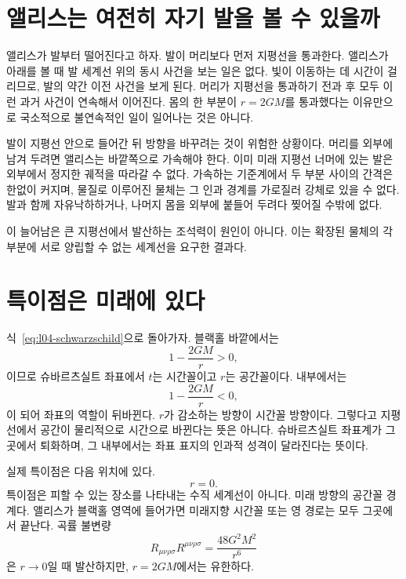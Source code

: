 \section{앨리스는 여전히 자기 발을 볼 수 있을까}

앨리스가 발부터 떨어진다고 하자. 발이 머리보다 먼저 지평선을 통과한다. 앨리스가 아래를 볼 때 발 세계선 위의 동시 사건을 보는 일은 없다. 빛이 이동하는 데 시간이 걸리므로, 발의 약간 이전 사건을 보게 된다. 머리가 지평선을 통과하기 전과 후 모두 이런 과거 사건이 연속해서 이어진다. 몸의 한 부분이 \(r=2GM\)를 통과했다는 이유만으로 국소적으로 불연속적인 일이 일어나는 것은 아니다.

발이 지평선 안으로 들어간 뒤 방향을 바꾸려는 것이 위험한 상황이다. 머리를 외부에 남겨 두려면 앨리스는 바깥쪽으로 가속해야 한다. 이미 미래 지평선 너머에 있는 발은 외부에서 정지한 궤적을 따라갈 수 없다. 가속하는 기준계에서 두 부분 사이의 간격은 한없이 커지며, 물질로 이루어진 물체는 그 인과 경계를 가로질러 강체로 있을 수 없다. 발과 함께 자유낙하하거나, 나머지 몸을 외부에 붙들어 두려다 찢어질 수밖에 없다.

이 늘어남은 큰 지평선에서 발산하는 조석력이 원인이 아니다. 이는 확장된 물체의 각 부분에 서로 양립할 수 없는 세계선을 요구한 결과다.

\section{특이점은 미래에 있다}

식~\eqref{eq:l04-schwarzschild}으로 돌아가자. 블랙홀 바깥에서는
\begin{equation}
1-\frac{2GM}{r}>0,
\end{equation}
이므로 슈바르츠실트 좌표에서 \(t\)는 시간꼴이고 \(r\)는 공간꼴이다. 내부에서는
\begin{equation}
1-\frac{2GM}{r}<0,
\end{equation}
이 되어 좌표의 역할이 뒤바뀐다. \(r\)가 감소하는 방향이 시간꼴 방향이다. 그렇다고 지평선에서 공간이 물리적으로 시간으로 바뀐다는 뜻은 아니다. 슈바르츠실트 좌표계가 그곳에서 퇴화하며, 그 내부에서는 좌표 표지의 인과적 성격이 달라진다는 뜻이다.

실제 특이점은 다음 위치에 있다.
\begin{equation}
r=0.
\end{equation}
특이점은 피할 수 있는 장소를 나타내는 수직 세계선이 아니다. 미래 방향의 공간꼴 경계다. 앨리스가 블랙홀 영역에 들어가면 미래지향 시간꼴 또는 영 경로는 모두 그곳에서 끝난다. 곡률 불변량
\begin{equation}
R_{\mu\nu\rho\sigma}R^{\mu\nu\rho\sigma}
=\frac{48G^2M^2}{r^6}
\label{eq:l04-kretschmann}
\end{equation}
은 \(r\to0\)일 때 발산하지만, \(r=2GM\)에서는 유한하다.

